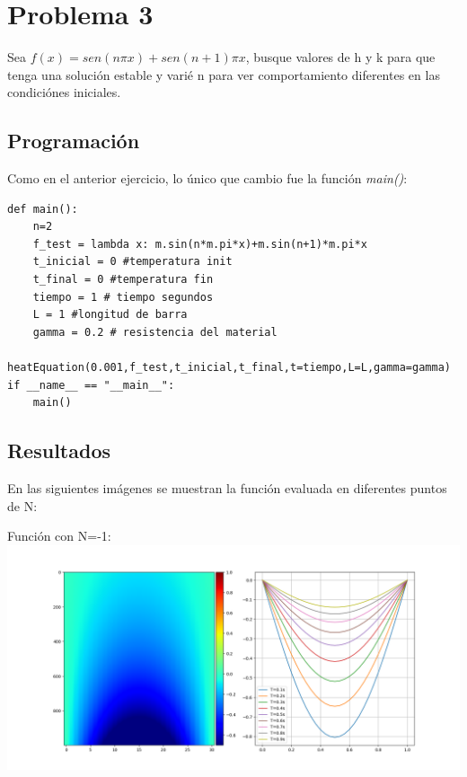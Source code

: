 \documentclass[a4paper,12pt]{article}
\newcommand{\eq}[1]{$#1$}
\begin{document}
    \section{Problema 3}
    Sea \eq{f(x) = sen(n\pi x) + sen(n + 1)\pi x}, busque valores de h y k para que
    tenga una solución estable y varié n para ver comportamiento diferentes
    en las condiciónes iniciales.
    \subsection{Programación}
    Como en el anterior ejercicio, lo único que cambio fue la función \emph{main()}:
\begin{lstlisting}[frame=single]
def main():
    n=2
    f_test = lambda x: m.sin(n*m.pi*x)+m.sin(n+1)*m.pi*x
    t_inicial = 0 #temperatura init
    t_final = 0 #temperatura fin
    tiempo = 1 # tiempo segundos
    L = 1 #longitud de barra
    gamma = 0.2 # resistencia del material
    heatEquation(0.001,f_test,t_inicial,t_final,t=tiempo,L=L,gamma=gamma)    
if __name__ == "__main__":
    main()
\end{lstlisting}

    \subsection{Resultados}
    En las siguientes imágenes se muestran la función evaluada en diferentes puntos de N:
    
    \begin{minipage}{\textwidth}
        Función con N=-1:\\
        \includegraphics[width=\textwidth]{ejer3_4_graph.png}
    \end{minipage}
\end{document}

